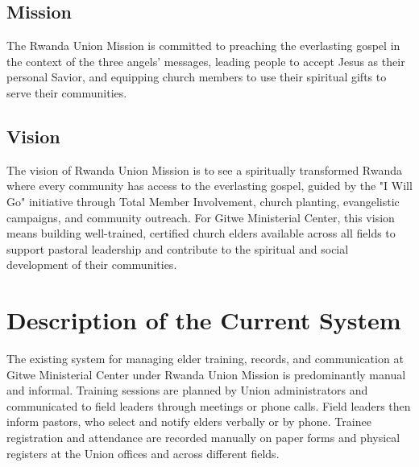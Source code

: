 \documentclass[12pt]{report}
\begin{document}
\subsection{Mission}
The Rwanda Union Mission is committed to preaching the everlasting gospel in the context of the three angels' messages, leading people to accept Jesus as their personal Savior, and equipping church members to use their spiritual gifts to serve their communities.

\subsection{Vision}
The vision of Rwanda Union Mission is to see a spiritually transformed Rwanda where every community has access to the everlasting gospel, guided by the "I Will Go" initiative through Total Member Involvement, church planting, evangelistic campaigns, and community outreach. For Gitwe Ministerial Center, this vision means building well-trained, certified church elders available across all fields to support pastoral leadership and contribute to the spiritual and social development of their communities.

\section{Description of the Current System}
The existing system for managing elder training, records, and communication at Gitwe Ministerial Center under Rwanda Union Mission is predominantly manual and informal. Training sessions are planned by Union administrators and communicated to field leaders through meetings or phone calls. Field leaders then inform pastors, who select and notify elders verbally or by phone. Trainee registration and attendance are recorded manually on paper forms and physical registers at the Union offices and across different fields.
\end{document}
